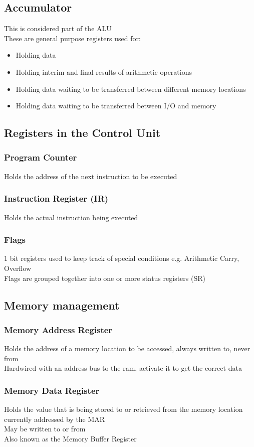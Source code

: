 \documentclass{article}[18pt]
\begin{document}
\subsection{Accumulator}
This is considered part of the ALU\\
These are general purpose registers used for:
\begin{itemize}
\item Holding data
\item Holding interim and final results of arithmetic operations
\item Holding data waiting to be transferred between different memory locations
\item Holding data waiting to be transferred between I/O and memory
\end{itemize}
\subsection{Registers in the Control Unit}
\subsubsection{Program Counter}
Holds the address of the next instruction to be executed
\subsubsection{Instruction Register (IR)}
Holds the actual instruction being executed
\subsubsection{Flags}
1 bit registers used to keep track of special conditions e.g. Arithmetic Carry, Overflow\\
Flags are grouped together into one or more status registers (SR)
\subsection{Memory management}
\subsubsection{Memory Address Register}
Holds the address of a memory location to be accessed, always written to, never from\\
Hardwired with an address bus to the ram, activate it to get the correct data
\subsubsection{Memory Data Register}
Holds the value that is being stored to or retrieved from the memory location currently addressed by the MAR\\
May be written to or from\\
Also known as the Memory Buffer Register
\end{document}
